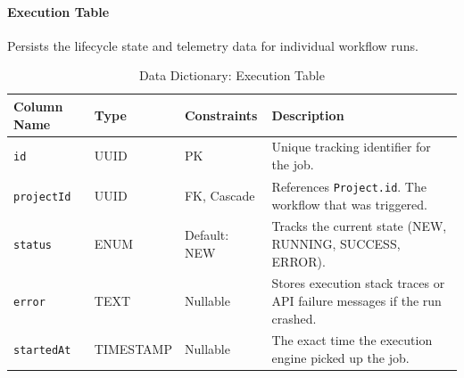 \paragraph{Execution Table}
Persists the lifecycle state and telemetry data for individual workflow runs.
\begin{table}[H]
\centering
\renewcommand{\arraystretch}{1.3}
\begin{tabularx}{\textwidth}{|l|l|l|X|}
\hline
\textbf{Column Name} & \textbf{Type} & \textbf{Constraints} & \textbf{Description} \\
\hline
\texttt{id} & UUID & PK & Unique tracking identifier for the job. \\
\hline
\texttt{projectId} & UUID & FK, Cascade & References \texttt{Project.id}. The workflow that was triggered. \\
\hline
\texttt{status} & ENUM & Default: NEW & Tracks the current state (NEW, RUNNING, SUCCESS, ERROR). \\
\hline
\texttt{error} & TEXT & Nullable & Stores execution stack traces or API failure messages if the run crashed. \\
\hline
\texttt{startedAt} & TIMESTAMP & Nullable & The exact time the execution engine picked up the job. \\
\hline
\end{tabularx}
\caption{Data Dictionary: Execution Table}
\label{tab:dict-execution}
\end{table}



